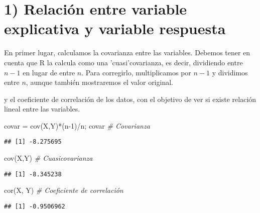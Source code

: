 \documentclass[
]{article}
\newenvironment{Shaded}{\begin{snugshade}}{\end{snugshade}}
\newcommand{\CommentTok}[1]{\textcolor[rgb]{0.56,0.35,0.01}{\textit{#1}}}
\newcommand{\DecValTok}[1]{\textcolor[rgb]{0.00,0.00,0.81}{#1}}
\newcommand{\FunctionTok}[1]{\textcolor[rgb]{0.00,0.00,0.00}{#1}}
\newcommand{\NormalTok}[1]{#1}
\newcommand{\OtherTok}[1]{\textcolor[rgb]{0.56,0.35,0.01}{#1}}
\newcommand{\SpecialCharTok}[1]{\textcolor[rgb]{0.00,0.00,0.00}{#1}}
\begin{document}
\hypertarget{relaciuxf3n-entre-variable-explicativa-y-variable-respuesta}{%
\section{1) Relación entre variable explicativa y variable
respuesta}\label{relaciuxf3n-entre-variable-explicativa-y-variable-respuesta}}

En primer lugar, calculamos la covarianza entre las variables. Debemos
tener en cuenta que R la calcula como una 'cuasi'covarianza, es decir,
dividiendo entre \(n-1\) en lugar de entre \(n\). Para corregirlo,
multiplicamos por \(n-1\) y dividimos entre \(n\), aunque también
mostraremos el valor original.

y el coeficiente de correlación de los datos, con el objetivo de ver si
existe relación lineal entre las variables.

\begin{Shaded}
\begin{Highlighting}[]
\NormalTok{covar }\OtherTok{=} \FunctionTok{cov}\NormalTok{(X,Y)}\SpecialCharTok{*}\NormalTok{(n}\DecValTok{{-}1}\NormalTok{)}\SpecialCharTok{/}\NormalTok{n; covar           }\CommentTok{\# Covarianza}
\end{Highlighting}
\end{Shaded}

\begin{verbatim}
## [1] -8.275695
\end{verbatim}

\begin{Shaded}
\begin{Highlighting}[]
\FunctionTok{cov}\NormalTok{(X,Y)                                  }\CommentTok{\# Cuasicovarianza}
\end{Highlighting}
\end{Shaded}

\begin{verbatim}
## [1] -8.345238
\end{verbatim}

\begin{Shaded}
\begin{Highlighting}[]
\FunctionTok{cor}\NormalTok{(X, Y)                                 }\CommentTok{\# Coeficiente de correlación}
\end{Highlighting}
\end{Shaded}

\begin{verbatim}
## [1] -0.9506962
\end{verbatim}
\end{document}
